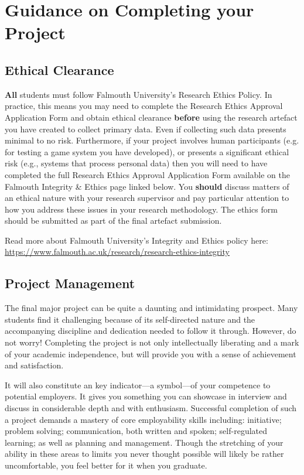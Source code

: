 \chapter{Guidance on Completing your Project}

\section*{Ethical Clearance}

\textbf{All} students must follow Falmouth University's Research Ethics Policy. In practice, this means you may need to complete the Research Ethics Approval Application Form and obtain ethical clearance \textbf{before} using the research artefact you have created to collect primary data. Even if collecting such data presents minimal to no risk. Furthermore, if your project involves human participants (e.g. for testing a game system you have developed), or presents a significant ethical risk (e.g., systems that process personal data) then you will need to have completed the full Research Ethics Approval Application Form available on the Falmouth Integrity \& Ethics page linked below. You \textbf{should} discuss matters of an ethical nature with your research supervisor and pay particular attention to how you address these issues in your research methodology. The ethics form should be submitted as part of the final artefact submission.

Read more about Falmouth University's Integrity and Ethics policy here: \url{https://www.falmouth.ac.uk/research/research-ethics-integrity}

\section*{Project Management}

The final major project can be quite a daunting and intimidating prospect. Many students find it challenging because of its self-directed nature and the accompanying discipline and dedication needed to follow it through. However, do not worry! Completing the project is not only intellectually liberating and a mark of your academic independence, but will provide you with a sense of achievement and satisfaction.

It will also constitute an key indicator---a symbol---of your competence to potential employers. It gives you something you can showcase in interview and discuss in considerable depth and with enthusiasm. Successful completion of such a project demands a mastery of core employability skills including: initiative; problem solving; communication, both written and spoken; self-regulated learning; as well as planning and management. Though the stretching of your ability in these areas to limits you never thought possible will likely be rather uncomfortable, you feel better for it when you graduate.

